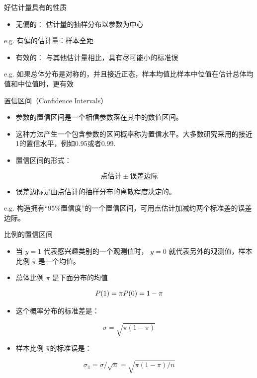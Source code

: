 \documentclass[presentation]{beamer}
\begin{document}
\begin{frame}[label={sec:org58143b2}]{好估计量具有的性质}
\begin{itemize}
\item \alert{无偏的：} 估计量的抽样分布以参数为中心
\end{itemize}
e.g. 有偏的估计量：样本全距
\begin{itemize}
\item \alert{有效的：} 与其他估计量相比，具有尽可能小的标准误
\end{itemize}
e.g. 如果总体分布是对称的，并且接近正态，样本均值比样本中位值在估计总体均值和中位值时，更有效
\end{frame}

\begin{frame}[label={sec:org6a9518c}]{置信区间（Confidence Intervals）}
\begin{itemize}
\item 参数的置信区间是一个相信参数落在其中的数值区间。
\item 这种方法产生一个包含参数的区间概率称为置信水平。大多数研究采用的接近1的置信水平，例如0.95或者0.99.

\item 置信区间的形式：
\end{itemize}
$$点估计 \pm 误差边际$$

\begin{itemize}
\item 误差边际是由点估计的抽样分布的离散程度决定的。
\end{itemize}

e.g. 构造拥有“95\%置信度”的一个置信区间，可用点估计加减约两个标准差的误差边际。
\end{frame}

\begin{frame}[label={sec:org1c7c799}]{比例的置信区间}
\begin{itemize}
\item 当 \(y = 1\) 代表感兴趣类别的一个观测值时， \(y = 0\) 就代表另外的观测值，样本比例 \(\hat \pi\) 是一个均值。

\item 总体比例 \(\pi\) 是下面分布的均值
\end{itemize}
$$P(1)=\pi \\ P(0)=1-\pi$$

\begin{itemize}
\item 这个概率分布的标准差是：
\end{itemize}
$$\sigma =\sqrt{\pi (1-\pi )}$$

\begin{itemize}
\item 样本比例 \(\hat \pi\)的标准误是：
\end{itemize}
$$\sigma_{\hat \pi}=\sigma / \sqrt{n}=\sqrt{\pi (1-\pi ) / n}$$
\end{frame}
\end{document}
